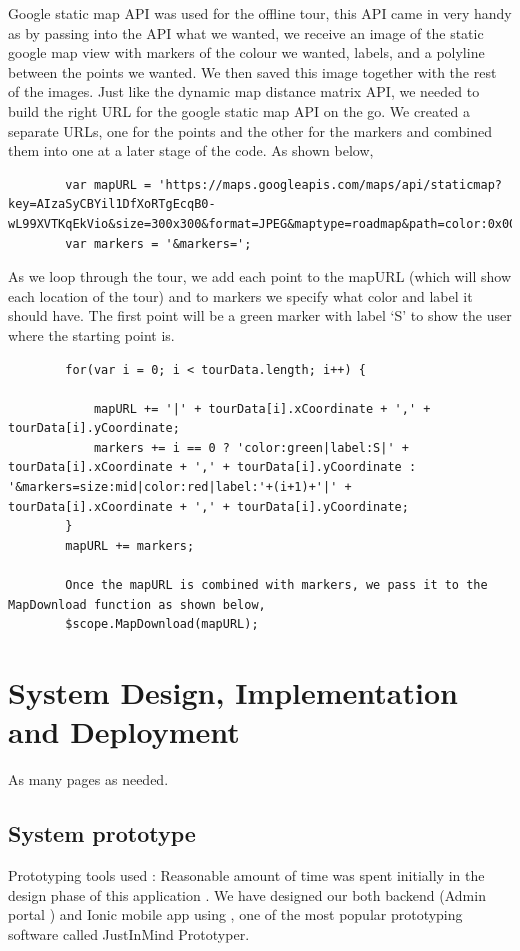		Google static map API was used for the offline tour, this API came in very handy as by passing into the API what we wanted, we receive an image of the static google map view with markers of the colour we wanted, labels, and a polyline between the points we wanted. We then saved this image together with the rest of the images. Just like the dynamic map distance matrix API, we needed to build the right URL for the google static map API on the go. We created a separate URLs, one for the points and the other for the markers and combined them into one at a later stage of the code. As shown below,
\begin{verbatim}
		var mapURL = 'https://maps.googleapis.com/maps/api/staticmap?key=AIzaSyCBYil1DfXoRTgEcqB0-wL99XVTKqEkVio&size=300x300&format=JPEG&maptype=roadmap&path=color:0x0000ff80|weight:1';
		var markers = '&markers=';
\end{verbatim}
		
		As we loop through the tour, we add each point to the mapURL (which will show each location of the tour) and to markers we specify what color and label it should have. The first point will be a green marker with label ‘S’ to show the user where the starting point is. 
		
\begin{verbatim}
		for(var i = 0; i < tourData.length; i++) {
			
			mapURL += '|' + tourData[i].xCoordinate + ',' + tourData[i].yCoordinate;
			markers += i == 0 ? 'color:green|label:S|' + tourData[i].xCoordinate + ',' + tourData[i].yCoordinate : '&markers=size:mid|color:red|label:'+(i+1)+'|' + tourData[i].xCoordinate + ',' + tourData[i].yCoordinate;
		}
		mapURL += markers;
		
		Once the mapURL is combined with markers, we pass it to the MapDownload function as shown below,
		$scope.MapDownload(mapURL);
\end{verbatim}
		



\chapter{System Design, Implementation and Deployment}
As many pages as needed.
	\section {System prototype}
	Prototyping tools used : Reasonable amount of time was spent initially in the design phase of this application . We have designed our both backend (Admin portal ) and Ionic mobile app using , one of the most popular prototyping software called JustInMind Prototyper. 
	
